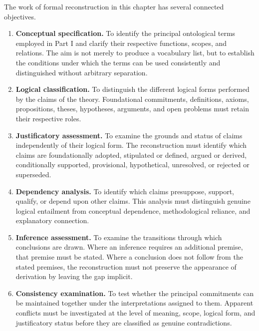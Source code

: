 The work of formal reconstruction in this chapter has several connected
objectives.

\begin{enumerate}
    \item \textbf{Conceptual specification.}
    To identify the principal ontological terms employed in Part I and
    clarify their respective functions, scopes, and relations. The aim is
    not merely to produce a vocabulary list, but to establish the conditions
    under which the terms can be used consistently and distinguished
    without arbitrary separation.

    \item \textbf{Logical classification.}
    To distinguish the different logical forms performed by the claims of
    the theory. Foundational commitments, definitions, axioms, propositions,
    theses, hypotheses, arguments, and open problems must retain their
    respective roles.

    \item \textbf{Justificatory assessment.}
    To examine the grounds and status of claims independently of their
    logical form. The reconstruction must identify which claims are
    foundationally adopted, stipulated or defined, argued or derived,
    conditionally supported, provisional, hypothetical, unresolved, or
    rejected or superseded.

    \item \textbf{Dependency analysis.}
    To identify which claims presuppose, support, qualify, or depend upon
    other claims. This analysis must distinguish genuine logical
    entailment from conceptual dependence, methodological reliance, and
    explanatory connection.

    \item \textbf{Inference assessment.}
    To examine the transitions through which conclusions are drawn. Where
    an inference requires an additional premise, that premise must be
    stated. Where a conclusion does not follow from the stated premises,
    the reconstruction must not preserve the appearance of derivation by
    leaving the gap implicit.

    \item \textbf{Consistency examination.}
    To test whether the principal commitments can be maintained together
    under the interpretations assigned to them. Apparent conflicts must be
    investigated at the level of meaning, scope, logical form, and
    justificatory status before they are classified as genuine
    contradictions.


\end{enumerate}
